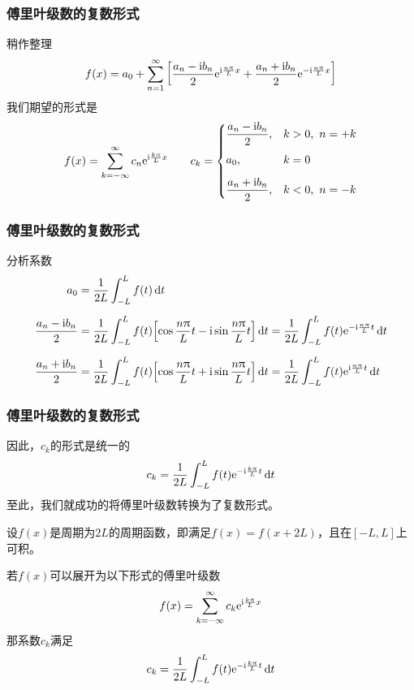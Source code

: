\begin{frame}
    \frametitle{傅里叶级数的复数形式}
    稍作整理
    \begin{equation}
        f(x)=a_0+\Sum[n=1][\infty]{\qty[
                    \frac{a_n-\i b_n}{2}
                    \e^{\i\frac{n\pi}{L}x}+
                    \frac{a_n+\i b_n}{2}
                    \e^{-\i\frac{n\pi}{L}x}]}
    \end{equation}
    我们期望的形式是
    \begin{equation}
        f(x)=\Sum[k=-\infty][\infty]{c_n\e^{\i\frac{k\pi}{L}x}}\qquad
        c_k=
        \begin{cases}
            \mal{\frac{a_n-\i b_n}{2}},&k>0,~n=+k\\[3mm]
            \mal{a_0},&k=0\\[3mm]
            \mal{\frac{a_n+\i b_n}{2}},&k<0,~n=-k
        \end{cases}
    \end{equation}
\end{frame}

\begin{frame}
    \frametitle{傅里叶级数的复数形式}
    分析系数
    \begin{align}
        a_0&=\frac{1}{2L}\Int[-L][L]{f(t)\dd{t}}\\[6pt]
        \frac{a_n-\i b_n}{2}
        &=\frac{1}{2L}
        \Int[-L][L]{f(t)\qty[\cos\frac{n\pi}{L}t-\i\sin\frac{n\pi}{L}t]\dd{t}}=
        \frac{1}{2L}
        \Int[-L][L]{f(t)\e^{-\i\frac{n\pi}{L}t}\dd{t}}\\[6pt]
        \frac{a_n+\i b_n}{2}
        &=\frac{1}{2L}
        \Int[-L][L]{f(t)\qty[\cos\frac{n\pi}{L}t+\i\sin\frac{n\pi}{L}t]\dd{t}}=
        \frac{1}{2L}
        \Int[-L][L]{f(t)\e^{\i\frac{n\pi}{L}t}\dd{t}}
    \end{align}
\end{frame}

\begin{frame}
    \frametitle{傅里叶级数的复数形式}
    因此，$c_k$的形式是统一的
    \begin{equation}
        c_k=\frac{1}{2L}
        \Int[-L][L]{f(t)\e^{-\i\frac{k\pi}{L}t}\dd{t}}
    \end{equation}
    至此，我们就成功的将傅里叶级数转换为了复数形式。
\end{frame}

\begin{frame}
    \begin{theorem}[傅里叶级数的复数形式]
        设$f(x)$是周期为$2L$的周期函数，即满足$f(x)=f(x+2L)$，且在$[-L,L]$上可积。

        若$f(x)$可以展开为以下形式的傅里叶级数
        \begin{equation}
            f(x)=\Sum[k=-\infty][\infty]{c_k\e^{\i\frac{k\pi}{L}x}}
        \end{equation}
        那系数$c_k$满足
        \begin{gather}
            c_k=\frac{1}{2L}
        \Int[-L][L]{f(t)\e^{-\i\frac{k\pi}{L}t}\dd{t}}
        \end{gather}
    \end{theorem}  
\end{frame}

